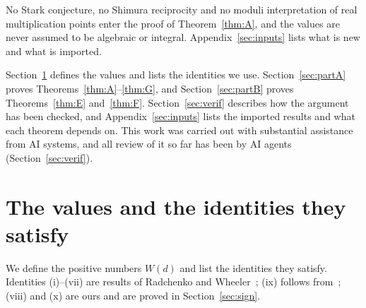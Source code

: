 \documentclass[11pt]{amsart}
\numberwithin{equation}{section}
\theoremstyle{plain}
\theoremstyle{definition}
\theoremstyle{remark}
\begin{document}
No Stark conjecture, no Shimura reciprocity and no moduli interpretation of real multiplication points enter the proof of Theorem~\ref{thm:A}, and the values are never assumed to be algebraic or integral. Appendix~\ref{sec:inputs} lists what is new and what is imported.

Section~\ref{sec:values} defines the values and lists the identities we use. Section~\ref{sec:partA} proves Theorems~\ref{thm:A}--\ref{thm:G}, and Section~\ref{sec:partB} proves Theorems~\ref{thm:E} and~\ref{thm:F}. Section~\ref{sec:verif} describes how the argument has been checked, and Appendix~\ref{sec:inputs} lists the imported results and what each theorem depends on. This work was carried out with substantial assistance from AI systems, and all review of it so far has been by AI agents (Section~\ref{sec:verif}).

\section{The values and the identities they satisfy}\label{sec:values}

We define the positive numbers \(W(d)\) and list the identities they satisfy. Identities (i)--(vii) are results of Radchenko and Wheeler~\cite{RW}; (ix) follows from~\cite[(3)]{RW}; (viii) and (x) are ours and are proved in Section~\ref{sec:sign}.
\end{document}
